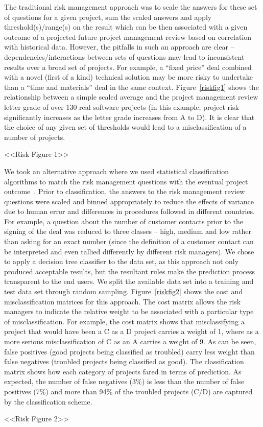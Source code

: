 The traditional risk management approach was to scale the answers for these set of questions for a given project, sum the scaled answers and apply threshold(s)/range(s) on the result which can be then associated with a given outcome of a projected future project management review based on correlation with historical data. However, the pitfalls in such an approach are clear – dependencies/interactions between sets of questions may lead to inconsistent results over a broad set of projects. For example, a “fixed price” deal combined with a novel (first of a kind) technical solution may be more risky to undertake than a “time and materials” deal in the same context. Figure~\ref{riskfig1} shows the relationship between a simple scaled average and the project management review letter grade of over 130 real software projects (in this example, project risk significantly increases as the letter grade increases from A to D). It is clear that the choice of any given set of thresholds would lead to a misclassification of a number of projects.

 <<Risk Figure 1>>

 We took an alternative approach where we used statistical classification algorithms to match the risk management questions with the eventual project outcome~\cite{risk28}. Prior to classification, the answers to the risk management review questions were scaled and binned appropriately to reduce the effects of variance due to human error and differences in procedures followed in different countries. For example, a question about the number of customer contacts prior to the signing of the deal was reduced to three classes – high, medium and low rather than asking for an exact number (since the definition of a customer contact can be interpreted and even tallied differently by different risk managers). We chose to apply a decision tree classifier to the data set, as this approach not only produced acceptable results, but the resultant rules make the prediction process transparent to the end users. We split the available data set into a training and test data set through random sampling. Figure~\ref{riskfig2} shows the cost and misclassification matrices for this approach. The cost matrix allows the risk managers to indicate the relative weight to be associated with a particular type of misclassification. For example, the cost matrix shows that misclassifying a project that would have been a C as a D project carries a weight of 1, where as a more serious misclassification of C as an A carries a weight of 9. As can be seen, false positives (good projects being classified as troubled) carry less weight than false negatives (troubled projects being classified as good). The classification matrix shows how each category of projects fared in terms of prediction. As expected, the number of false negatives (3\%) is less than the number of false positives (7\%) and more than 94\% of the troubled projects (C/D) are captured by the classification scheme.
 
<<Risk Figure 2>>


\label{sec:risk}

